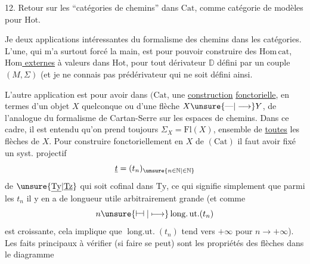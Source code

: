 12. Retour sur les ``catégories de chemins'' dans $\mathrm{Cat}$, comme
catégorie de modèles pour $\mathrm{Hot}$.

Je   deux applications intéressantes
du formalisme des chemins dans les catégories.
L'une, qui m'a surtout forcé la main, est
pour pouvoir construire des $\mathrm{Hom}\,\mathrm{cat}$, \uline{$\mathrm{Hom}$
externes} à valeurs dans $\mathrm{Hot}$, pour tout dérivateur
$\mathbb D$ défini par un couple $(M,\Sigma)$ (et je
ne connais pas  prédérivateur qui ne
soit défini ainsi.

L'autre application est pour avoir dans $(\mathrm{Cat}$,
une \uline{construction} \uline{fonctorielle}, en termes
d'un objet $X$ quelconque ou d'une 
flèche $X\unsure{\text{---}|\longrightarrow}Y$, de l'analogue du formalisme
de Cartan-Serre sur les espaces de
chemins. Dans ce cadre, il est entendu
qu'on prend toujours $\Sigma_X=\mathrm{Fl}(X)$, ensemble de
\uline{toutes} les flèches de $X$. Pour construire
fonctoriellement en $X$ de $(\mathrm{Cat})$
il faut avoir fixé un syst. projectif
\[
\underline t=(t_n)_{\unsure{n\in\mathbb N|\in\mathbb N}}
\]
de $\unsure{\underline{\mathrm{Ty}}|\underline{\mathrm{Tz}}}$ qui soit cofinal dans $\underline{\mathrm{Ty}}$, ce qui signifie
simplement que parmi les $t_n$ il y en a de longueur
utile arbitrairement grande (et comme
\[
n\unsure{\mathrel{\vdash\!\dashv}|\longmapsto}\operatorname{long.ut.}(t_n)
\]
est croissante, cela implique que $\operatorname{long.ut.}(t_n)$
tend vers $+\infty$ pour $n\longrightarrow+\infty$).  Les
faits principaux à vérifier  (si faire se peut)
sont les propriétés  des flèches
dans le diagramme
